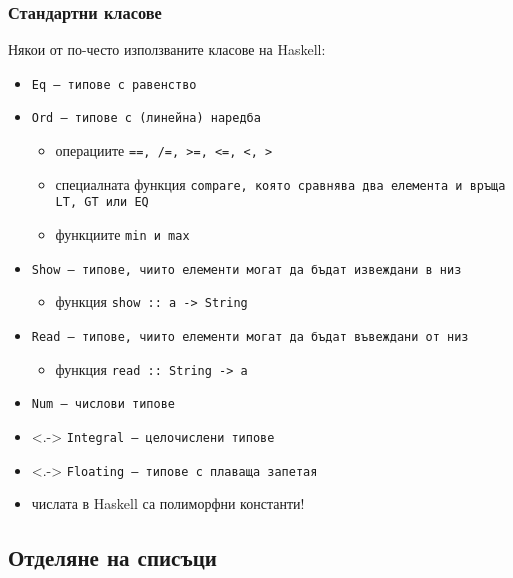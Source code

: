 \documentclass{beamer}
\begin{document}
\begin{frame}
  \frametitle{Стандартни класове}
  Някои от по-често използваните класове на Haskell:
  \begin{itemize}[<+->]
  \item \tt{Eq} --- типове с равенство
  \item \tt{Ord} --- типове с (линейна) наредба
    \begin{itemize}[<.->]
    \item операциите \tt{==}, \tt{/=}, \tt{>=}, \tt{<=}, \tt{<}, \tt{>}
    \item специалната функция \tt{compare}, която сравнява два елемента и връща \tt{LT}, \tt{GT} или \tt{EQ}
    \item функциите \tt{min} и \tt{max}
    \end{itemize}
  \item \tt{Show} --- типове, чиито елементи могат да бъдат извеждани в низ
    \begin{itemize}[<.->]
    \item функция \tt{show :: a -> String}
    \end{itemize}
  \item \tt{Read} --- типове, чиито елементи могат да бъдат въвеждани от низ
    \begin{itemize}[<.->]
    \item функция \tt{read :: String -> a}
    \end{itemize}
  \item \tt{Num} --- числови типове
  \item<.-> \tt{Integral} --- целочислени типове
  \item<.-> \tt{Floating} --- типове с плаваща запетая
  \item \alert{числата в Haskell са полиморфни константи!}
  \end{itemize}
\end{frame}

\subsection{Отделяне на списъци}
\end{document}
